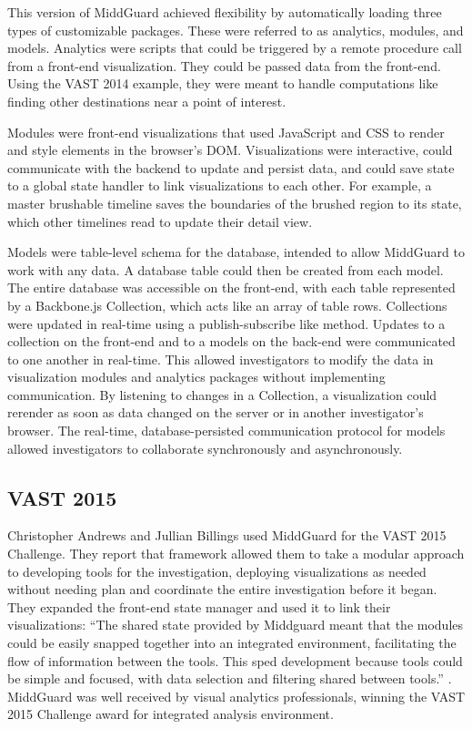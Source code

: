 \documentclass[midd]{thesis}
\begin{document}
This version of MiddGuard achieved flexibility by automatically loading three
types of customizable packages. These were referred to as analytics, modules,
and models. Analytics were scripts that could be triggered by a remote procedure
call from a front-end visualization. They could be passed data from the
front-end. Using the VAST 2014 example, they were meant to handle computations
like finding other destinations near a point of interest.

Modules were front-end visualizations that used JavaScript and CSS to render and
style elements in the browser's DOM. Visualizations were interactive, could
communicate with the backend to update and persist data, and could save state to
a global state handler to link visualizations to each other. For example, a
master brushable timeline saves the boundaries of the brushed region to its
state, which other timelines read to update their detail view.

Models were table-level schema for the database, intended to allow MiddGuard to
work with any data. A database table could then be created from each model. The
entire database was accessible on the front-end, with each table represented by
a Backbone.js Collection, which acts like an array of table rows. Collections
were updated in real-time using a publish-subscribe like method. Updates to a
collection on the front-end and to a models on the back-end were communicated to
one another in real-time. This allowed investigators to modify the data in
visualization modules and analytics packages without implementing communication.
By listening to changes in a Collection, a visualization could rerender as soon
as data changed on the server or in another investigator's browser. The
real-time, database-persisted communication protocol for models allowed
investigators to collaborate synchronously and asynchronously.

\subsection{VAST 2015}

Christopher Andrews and Jullian Billings used MiddGuard for the VAST 2015
Challenge. They report that framework allowed them to take a modular approach to
developing tools for the investigation, deploying visualizations as needed
without needing plan and coordinate the entire investigation before it began.
They expanded the front-end state manager and used it to link their
visualizations: ``The shared state provided by Middguard meant that the modules
could be easily snapped together into an integrated environment, facilitating
the flow of information between the tools. This sped development because tools
could be simple and focused, with data selection and filtering shared between
tools.'' \cite{middguard-dinofunworld}. MiddGuard was well received by visual
analytics professionals, winning the VAST 2015 Challenge award for integrated
analysis environment.
\end{document}

